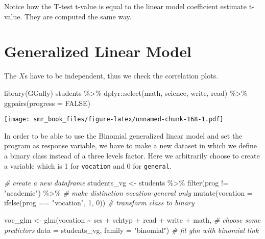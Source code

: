 \documentclass[
  oneside]{book}
\newenvironment{Shaded}{\begin{snugshade}}{\end{snugshade}}
\newcommand{\AttributeTok}[1]{\textcolor[rgb]{0.77,0.63,0.00}{#1}}
\newcommand{\CommentTok}[1]{\textcolor[rgb]{0.56,0.35,0.01}{\textit{#1}}}
\newcommand{\ConstantTok}[1]{\textcolor[rgb]{0.00,0.00,0.00}{#1}}
\newcommand{\DecValTok}[1]{\textcolor[rgb]{0.00,0.00,0.81}{#1}}
\newcommand{\FunctionTok}[1]{\textcolor[rgb]{0.00,0.00,0.00}{#1}}
\newcommand{\NormalTok}[1]{#1}
\newcommand{\OtherTok}[1]{\textcolor[rgb]{0.56,0.35,0.01}{#1}}
\newcommand{\SpecialCharTok}[1]{\textcolor[rgb]{0.00,0.00,0.00}{#1}}
\newcommand{\StringTok}[1]{\textcolor[rgb]{0.31,0.60,0.02}{#1}}
\begin{document}
Notice how the T-test t-value is equal to the linear model coefficient estimate t-value.
They are computed the same way.

\hypertarget{generalized-linear-model}{%
\section{Generalized Linear Model}\label{generalized-linear-model}}

The \(X\)s have to be independent, thus we check the correlation plots.

\begin{Shaded}
\begin{Highlighting}[]
\FunctionTok{library}\NormalTok{(GGally)}
\NormalTok{students }\SpecialCharTok{\%\textgreater{}\%}
\NormalTok{  dplyr}\SpecialCharTok{::}\FunctionTok{select}\NormalTok{(math, science, write, read) }\SpecialCharTok{\%\textgreater{}\%}
  \FunctionTok{ggpairs}\NormalTok{(}\AttributeTok{progress =} \ConstantTok{FALSE}\NormalTok{)}
\end{Highlighting}
\end{Shaded}

\texttt{[image: smr\_book\_files/figure-latex/unnamed-chunk-168-1.pdf]}

In order to be able to use the Binomial generalized linear model
and set the program as response variable, we have to make a new
dataset in which we define a binary class instead of a three levels
factor. Here we arbitrarily choose to create a variable which is
1 for \texttt{vocation} and 0 for \texttt{general}.

\begin{Shaded}
\begin{Highlighting}[]
\CommentTok{\# create a new dataframe }
\NormalTok{students\_vg }\OtherTok{\textless{}{-}}\NormalTok{ students }\SpecialCharTok{\%\textgreater{}\%}
  \FunctionTok{filter}\NormalTok{(prog }\SpecialCharTok{!=} \StringTok{"academic"}\NormalTok{) }\SpecialCharTok{\%\textgreater{}\%} \CommentTok{\# make distinction vocation{-}general only}
  \FunctionTok{mutate}\NormalTok{(}\AttributeTok{vocation =} \FunctionTok{ifelse}\NormalTok{(prog }\SpecialCharTok{==} \StringTok{"vocation"}\NormalTok{, }\DecValTok{1}\NormalTok{, }\DecValTok{0}\NormalTok{)) }\CommentTok{\# transform class to binary}

\NormalTok{voc\_glm }\OtherTok{\textless{}{-}} \FunctionTok{glm}\NormalTok{(vocation }\SpecialCharTok{\textasciitilde{}}\NormalTok{ ses }\SpecialCharTok{+}\NormalTok{ schtyp }\SpecialCharTok{+}\NormalTok{ read }\SpecialCharTok{+}\NormalTok{ write }\SpecialCharTok{+}\NormalTok{ math, }\CommentTok{\# choose some predictors}
      \AttributeTok{data =}\NormalTok{ students\_vg, }\AttributeTok{family =} \StringTok{"binomial"}\NormalTok{) }\CommentTok{\# fit glm with binomial link }
\end{Highlighting}
\end{Shaded}
\end{document}
